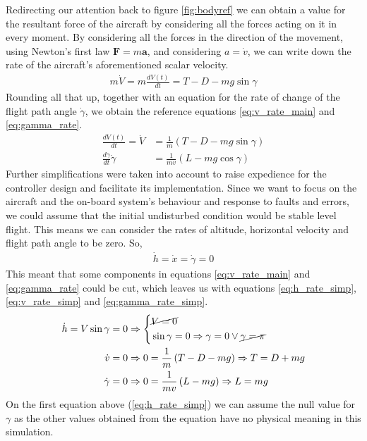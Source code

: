 \documentclass[english,palatino]{ist-report}
\begin{document}
Redirecting our attention back to figure \ref{fig:bodyref} we can obtain a value for the resultant force of the aircraft by considering all the forces acting on it in every moment. By considering all the forces in the direction of the movement, using Newton's first law $\mathbf{F} = m\mathbf{a}$, and considering $a = \dot{v}$, we can write down the rate of the aircraft's aforementioned scalar velocity.
\begin{gather}\label{eq:v_rate}
	m\dot{V} = m\frac{dV(t)}{dt} = T - D - mg\sin\gamma
\end{gather}
Rounding all that up, together with an equation for the rate of change of the flight path angle $\dot{\gamma}$, we obtain the reference equations \ref{eq:v_rate_main} and \ref{eq:gamma_rate}.
\begin{align}
	\label{eq:v_rate_main}
	\frac{dV(t)}{dt} = \dot{V} &= \frac{1}{m}\left(T - D - mg\sin\gamma\right) \\
	\label{eq:gamma_rate}
	\frac{d\gamma}{dt} \dot{\gamma} &= \frac{1}{mv}\left(L - mg\cos\gamma\right)
\end{align}
Further simplifications were taken into account to raise expedience for the controller design and facilitate its implementation. Since we want to focus on the aircraft and the on-board system's behaviour and response to faults and errors, we could assume that the initial undisturbed condition would be stable level flight. This means we can consider the rates of altitude, horizontal velocity and flight path angle to be zero. So,
\begin{gather*}
	\dot{h} = \dot{x} = \dot{\gamma} = 0
\end{gather*}
This meant that some components in equations \ref{eq:v_rate_main} and \ref{eq:gamma_rate} could be cut, which leaves us with equations \ref{eq:h_rate_simp}, \ref{eq:v_rate_simp} and \ref{eq:gamma_rate_simp}.
\begin{align}
	\label{eq:h_rate_simp}
	\dot{h} = V\sin\gamma = 0 &\Rightarrow \left\{\begin{aligned}
		&\cancel{V = 0} \\
		&\sin\gamma = 0 \Rightarrow \gamma = 0 \vee \cancel{\gamma = \pi}
	\end{aligned}\right. \\
	\label{eq:v_rate_simp}
	\dot{v} = 0 &\Rightarrow 0 = \frac{1}{m}\left(T - D - mg\right) \Rightarrow T = D + mg \\
	\label{eq:gamma_rate_simp}
	\dot{\gamma} = 0 &\Rightarrow 0 = \frac{1}{mv}\left(L - mg\right) \Rightarrow L = mg
\end{align}
On the first equation above (\ref{eq:h_rate_simp}) we can assume the null value for $\gamma$ as the other values obtained from the equation have no physical meaning in this simulation.
\end{document}
